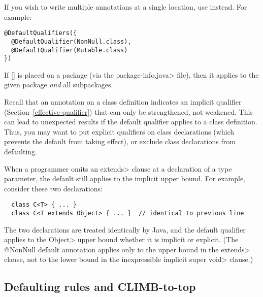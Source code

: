 If you wish to write multiple
 annotations at a single location,
use
 instead.  For example:

\begin{Verbatim}
@DefaultQualifiers({
  @DefaultQualifier(NonNull.class),
  @DefaultQualifier(Mutable.class)
})
\end{Verbatim}


If [] is placed on a package (via the
\<package-info.java> file), then it applies to the given package \emph{and}
all subpackages.

Recall that an annotation on a class definition indicates an implicit
qualifier (Section~\ref{effective-qualifier}) that can only be
strengthened, not weakened.  This can lead to unexpected results if
the default qualifier applies to a class definition.  Thus, you may want to
put explicit qualifiers on class declarations (which prevents the default
from taking effect), or exclude class declarations from defaulting.




When a programmer omits an \<extends> clause at a declaration of a type
parameter, the default still applies to the implicit upper bound.  For
example, consider these two declarations:

\begin{Verbatim}
  class C<T> { ... }
  class C<T extends Object> { ... }  // identical to previous line
\end{Verbatim}

\noindent
The two declarations are treated identically by Java, and the default
qualifier applies to the \<Object> upper bound whether it is implicit or
explicit.  (The @NonNull default annotation applies only to the upper bound
in the \<extends> clause, not to the lower bound in the inexpressible
implicit \<super void> clause.)


\subsection{Defaulting rules and CLIMB-to-top\label{climb-to-top}}

